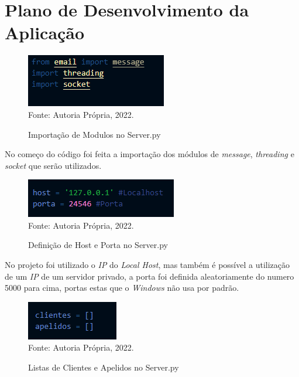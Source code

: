 \newpage\thispagestyle{empty}
\chapter{\textbf{Plano de Desenvolvimento da Aplicação}}

\par

\begin{figure}[htbp]
	\centering
	\caption{Importação de Modulos no Server.py}
	\includegraphics[]{PrintsServer/Captura de tela 2022-05-01 164434.png}
	{\\Fonte: Autoria Própria, 2022.}
	\label{fig:criação_1}
\end{figure}

\par No começo do código foi feita a importação dos módulos de \textit{message}, \textit{threading} e \textit{socket} que serão utilizados.
\newline

\begin{figure}[htbp]
	\centering
	\caption{Definição de Host e Porta no Server.py}
	\includegraphics[]{PrintsServer/HostPort.png}
	{\\Fonte: Autoria Própria, 2022.}
	\label{fig:criação_1}
\end{figure}

\par No projeto foi utilizado o \textit{IP} do \textit{Local Host}, mas também é possível a utilização de um \textit{IP} de um servidor privado, a porta foi definida aleatoriamente do numero 5000 para cima, portas estas que o \textit{Windows} não usa por padrão.
\newline

\begin{figure}[htbp]
	\centering
	\caption{Listas de Clientes e Apelidos no Server.py}
	\includegraphics[]{PrintsServer/Client.png}
	{\\Fonte: Autoria Própria, 2022.}
	\label{fig:criação_1}
\end{figure}

